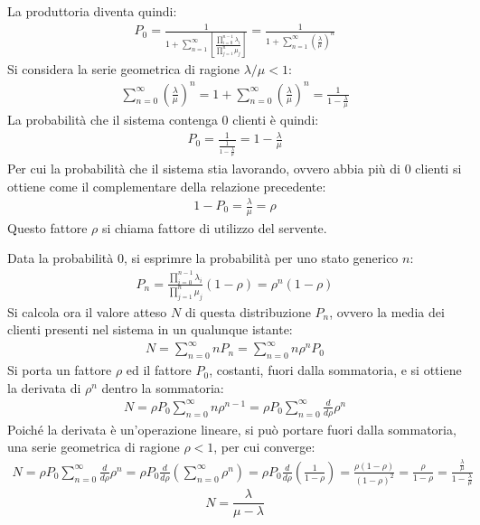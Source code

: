 \documentclass{article}
\numberwithin{equation}{subsection}
\begin{document}
La produttoria diventa quindi:
\begin{gather*}
    P_0=\displaystyle\frac{1}{1+\displaystyle\sum_{n=1}^{\infty}\left[\frac{\displaystyle\prod_{i=0}^{n-1}\lambda_i}{\displaystyle\prod_{j=1}^n\mu_j}\right]}=\frac{1}{1+\displaystyle\sum_{n=1}^{\infty}\left(\frac{\lambda}{\mu}\right)^n}
\end{gather*}
Si considera la serie geometrica di ragione $\lambda/\mu<1$:
\begin{gather*}
    \displaystyle\sum_{n=0}^{\infty}\left(\frac{\lambda}{\mu}\right)^n=1+\sum_{n=0}^{\infty}\left(\frac{\lambda}{\mu}\right)^n=\frac{1}{1-\displaystyle\frac{\lambda}{\mu}}
\end{gather*}
La probabilità che il sistema contenga $0$ clienti è quindi:
\begin{gather*}
    P_0=\displaystyle\frac{1}{\displaystyle\frac{1}{1-\displaystyle\frac{\lambda}{\mu}}}=1-\frac{\lambda}{\mu}
\end{gather*}
Per cui la probabilità che il sistema stia lavorando, ovvero abbia più di $0$ clienti si ottiene come il complementare della relazione precedente:
\begin{gather*}
    1-P_0=\displaystyle\frac{\lambda}{\mu}=\rho
\end{gather*}
Questo fattore $\rho$ si chiama fattore di utilizzo del servente. 

Data la probabilità $0$, si esprimre la probabilità per uno stato generico $n$:
\begin{gather*}
    P_n=\displaystyle\frac{\displaystyle\prod_{i=0}^{n-1}\lambda_i}{\displaystyle\prod_{j=1}^n\mu_j}\left(1-\rho\right)=\rho^n\left(1-\rho\right)
\end{gather*}
Si calcola ora il valore atteso $N$ di questa distribuzione $P_n$, ovvero la media dei clienti presenti nel sistema in un qualunque istante:
\begin{gather*}
    N=\displaystyle\sum_{n=0}^{\infty}nP_n=\sum_{n=0}^{\infty}n\rho^nP_0
\end{gather*}
Si porta un fattore $\rho$ ed il fattore $P_0$, costanti, fuori dalla sommatoria, e si ottiene la derivata di $\rho^n$ dentro la sommatoria:
\begin{gather*}
    N=\rho P_0\displaystyle\sum_{n=0}^{\infty}n\rho^{n-1}=\rho P_0\displaystyle\sum_{n=0}^{\infty}\frac{d}{d\rho}\rho^n
\end{gather*}
Poiché la derivata è un'operazione lineare, si può portare fuori dalla sommatoria, una serie geometrica di ragione $\rho<1$, per cui converge:
\begin{gather*}
    N=\rho P_0\displaystyle\sum_{n=0}^{\infty}\frac{d}{d\rho}\rho^n=\rho P_0\frac{d}{d\rho}\left(\sum_{n=0}^{\infty}\rho^n\right)=\rho P_0\frac{d}{d\rho}\left(\frac{1}{1-\rho}\right)=\frac{\rho(1-\rho)}{(1-\rho)^2}=\frac{\rho}{1-\rho}=\frac{\displaystyle\frac{\lambda}{\mu}}{1-\displaystyle\frac{\lambda}{\mu}}
\end{gather*}
\begin{equation}
    N=\displaystyle\frac{\lambda}{\mu-\lambda}
\end{equation}
\end{document}
